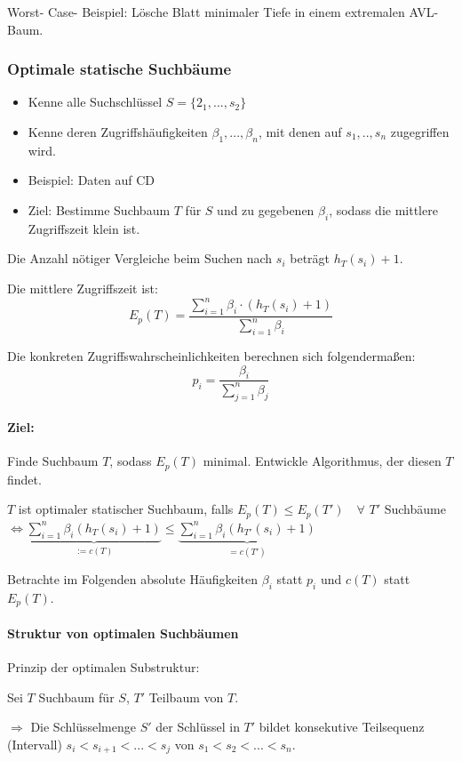 \documentclass[fleqn]{scrartcl}
\begin{document}
Worst- Case- Beispiel: Lösche Blatt minimaler Tiefe in einem extremalen AVL- Baum.

\subsubsection{Optimale statische Suchbäume}
\begin{itemize}
\item Kenne alle Suchschlüssel $S = \{2_1, ..., s_2\}$
\item Kenne deren Zugriffshäufigkeiten $\beta_1, ..., \beta_n$, mit denen auf $s_1, .., s_n$ zugegriffen wird.
\item Beispiel: Daten auf CD
\item Ziel: Bestimme Suchbaum $T$ für $S$ und zu gegebenen $\beta_i$, sodass die mittlere Zugriffszeit klein ist.
\end{itemize}

Die Anzahl nötiger Vergleiche beim Suchen nach $s_i$ beträgt $h_T(s_i) + 1$.

Die mittlere Zugriffszeit ist:
\[E_p(T) = \frac{\sum\limits_{i = 1}^{n} \beta_i \cdot (h_T(s_i) + 1)}{\sum\limits_{i = 1}^{n} \beta_i}\]

Die konkreten Zugriffswahrscheinlichkeiten berechnen sich folgendermaßen:
\[p_i = \frac{\beta_i}{\sum\limits_{j = 1}^{n} \beta_j}\]

\paragraph{Ziel:} Finde Suchbaum $T$, sodass $E_p(T)$ minimal. Entwickle Algorithmus, der diesen $T$ findet.

$T$ ist optimaler statischer Suchbaum, falls $E_p(T) \leq E_p(T') \quad \forall \,\, T'$ Suchbäume $\Leftrightarrow \underbrace{\sum\limits_{i = 1}^{n} \beta_i (h_T(s_i) + 1)}_{:= c(T)} \leq \underbrace{\sum\limits_{i=1}^{n} \beta_i (h_{T'}(s_i) + 1)}_{= c(T')}$

Betrachte im Folgenden absolute Häufigkeiten $\beta_i$ statt $p_i$ und $c(T)$ statt $E_p(T)$.

\paragraph{Struktur von optimalen Suchbäumen}
Prinzip der optimalen Substruktur:

Sei $T$ Suchbaum für $S$, $T'$ Teilbaum von $T$.

$\Rightarrow$ Die Schlüsselmenge $S'$ der Schlüssel in $T'$ bildet konsekutive Teilsequenz (Intervall) $s_i < s_{i+1} < ... < s_j$ von $s_1 < s_2 < ... < s_n$.
\end{document}

